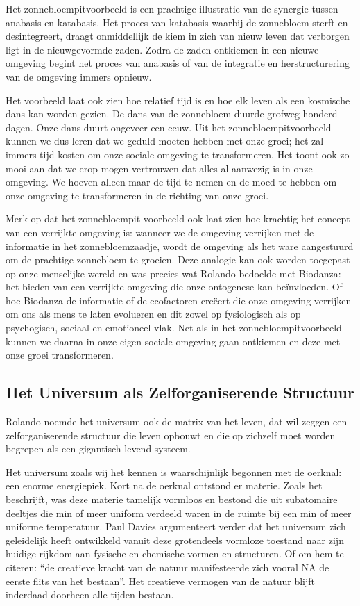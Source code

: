 \documentclass[
  11pt,
]{book}
\begin{document}
Het zonnebloempitvoorbeeld is een prachtige illustratie van de synergie tussen anabasis en katabasis. Het proces van katabasis waarbij de zonnebloem sterft en desintegreert, draagt onmiddellijk de kiem in zich van nieuw leven dat verborgen ligt in de nieuwgevormde zaden. Zodra de zaden ontkiemen in een nieuwe omgeving begint het proces van anabasis of van de integratie en herstructurering van de omgeving immers opnieuw.

Het voorbeeld laat ook zien hoe relatief tijd is en hoe elk leven als een kosmische dans kan worden gezien. De dans van de zonnebloem duurde grofweg honderd dagen. Onze dans duurt ongeveer een eeuw. Uit het zonnebloempitvoorbeeld kunnen we dus leren dat we geduld moeten hebben met onze groei; het zal immers tijd kosten om onze sociale omgeving te transformeren. Het toont ook zo mooi aan dat we erop mogen vertrouwen dat alles al aanwezig is in onze omgeving. We hoeven alleen maar de tijd te nemen en de moed te hebben om onze omgeving te transformeren in de richting van onze groei.

Merk op dat het zonnebloempit-voorbeeld ook laat zien hoe krachtig het concept van een verrijkte omgeving is: wanneer we de omgeving verrijken met de informatie in het zonnebloemzaadje, wordt de omgeving als het ware aangestuurd om de prachtige zonnebloem te groeien. Deze analogie kan ook worden toegepast op onze menselijke wereld en was precies wat Rolando bedoelde met Biodanza: het bieden van een verrijkte omgeving die onze ontogenese kan beïnvloeden. Of hoe Biodanza de informatie of de ecofactoren creëert die onze omgeving verrijken om ons als mens te laten evolueren en dit zowel op fysiologisch als op psychogisch, sociaal en emotioneel vlak. Net als in het zonnebloempitvoorbeeld kunnen we daarna in onze eigen sociale omgeving gaan ontkiemen en deze met onze groei transformeren.

\hypertarget{het-universum-als-zelforganiserende-structuur}{%
\subsection{Het Universum als Zelforganiserende Structuur}\label{het-universum-als-zelforganiserende-structuur}}

Rolando noemde het universum ook de matrix van het leven, dat wil zeggen een zelforganiserende structuur die leven opbouwt en die op zichzelf moet worden begrepen als een gigantisch levend systeem.

Het universum zoals wij het kennen is waarschijnlijk begonnen met de oerknal: een enorme energiepiek. Kort na de oerknal ontstond er materie. Zoals \citet{davies1987} het beschrijft, was deze materie tamelijk vormloos en bestond die uit subatomaire deeltjes die min of meer uniform verdeeld waren in de ruimte bij een min of meer uniforme temperatuur. Paul Davies argumenteert verder dat het universum zich geleidelijk heeft ontwikkeld vanuit deze grotendeels vormloze toestand naar zijn huidige rijkdom aan fysische en chemische vormen en structuren. Of om hem te citeren: ``de creatieve kracht van de natuur manifesteerde zich vooral NA de eerste flits van het bestaan''. Het creatieve vermogen van de natuur blijft inderdaad doorheen alle tijden bestaan.
\end{document}
